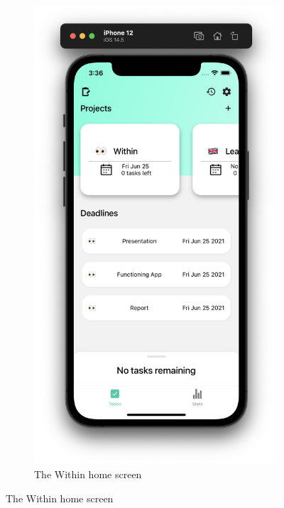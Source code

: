\begin{figure}[h]
\begin{subfigure}{0.4\linewidth}
        \centering
        \includegraphics[scale=0.25]{images/home_screen.png}
        \caption{The Within home screen}
        \label{fig:home_screen}
    \end{subfigure}%
\end{figure}



